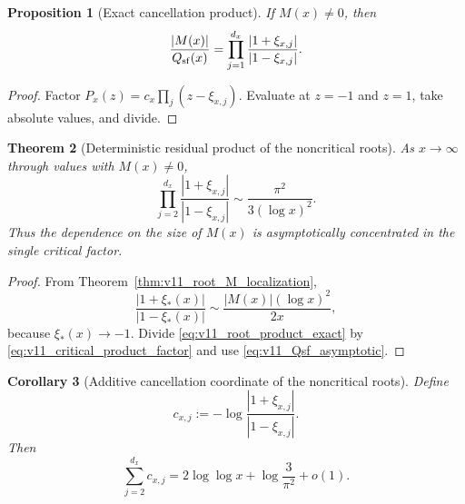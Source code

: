 \documentclass[11pt]{amsart}
\numberwithin{equation}{section}
\theoremstyle{plain}
\newtheorem{theorem}{Theorem}[section]
\newtheorem{proposition}[theorem]{Proposition}
\newtheorem{corollary}[theorem]{Corollary}
\theoremstyle{definition}
\theoremstyle{remark}
\begin{document}
\begin{proposition}[Exact cancellation product]
\label{prop:v11_root_product_exact}
If \(M(x)\ne0\), then
\begin{equation}
\frac{|M(x)|}{Q_{\rm sf}(x)}
=
\prod_{j=1}^{d_x}
\frac{|1+\xi_{x,j}|}{|1-\xi_{x,j}|}.
\label{eq:v11_root_product_exact}
\end{equation}
\end{proposition}

\begin{proof}
Factor
\(P_x(z)=c_x\prod_j(z-\xi_{x,j})\).  Evaluate at \(z=-1\) and \(z=1\),
take absolute values, and divide.
\end{proof}

\begin{theorem}[Deterministic residual product of the noncritical roots]
\label{thm:v11_noncritical_product}
As \(x\to\infty\) through values with \(M(x)\ne0\),
\begin{equation}
\boxed{
\prod_{j=2}^{d_x}
\frac{|1+\xi_{x,j}|}{|1-\xi_{x,j}|}
\sim
\frac{\pi^2}{3(\log x)^2}.}
\label{eq:v11_noncritical_product}
\end{equation}
Thus the dependence on the size of \(M(x)\) is asymptotically concentrated
in the single critical factor.
\end{theorem}

\begin{proof}
From Theorem~\ref{thm:v11_root_M_localization},
\begin{equation}
\frac{|1+\xi_*(x)|}{|1-\xi_*(x)|}
\sim
\frac{|M(x)|(\log x)^2}{2x},
\label{eq:v11_critical_product_factor}
\end{equation}
because \(\xi_*(x)\to-1\).  Divide
\eqref{eq:v11_root_product_exact} by
\eqref{eq:v11_critical_product_factor} and use
\eqref{eq:v11_Qsf_asymptotic}.
\end{proof}

\begin{corollary}[Additive cancellation coordinate of the noncritical roots]
\label{cor:v11_noncritical_logsum}
Define
\begin{equation}
c_{x,j}:=-\log\frac{|1+\xi_{x,j}|}{|1-\xi_{x,j}|}.
\label{eq:v11_cxj}
\end{equation}
Then
\begin{equation}
\boxed{
\sum_{j=2}^{d_x}c_{x,j}
=2\log\log x+\log\frac{3}{\pi^2}+o(1).}
\label{eq:v11_noncritical_logsum}
\end{equation}
\end{corollary}
\end{document}
